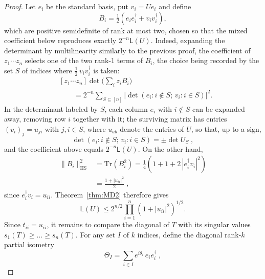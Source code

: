 \documentclass[aps,prl,twocolumn,superscriptaddress,reprint,longbibliography,nofootinbib]{revtex4-2}
\begin{document}
\begin{proof}
Let $e_i$ be the standard basis, put $v_i=Ue_i$ and define
\begin{equation}
    B_i=\tfrac12\left(e_ie_i^\dagger+v_iv_i^\dagger\right),
\end{equation}
 which are positive semidefinite of rank at most two, chosen so that the mixed coefficient below reproduces exactly $2^{-n}\mathsf{L}(U)$. Indeed, expanding the determinant by multilinearity similarly to the previous proof, the coefficient of $z_1\cdots z_n$ selects one of the two rank-1 terms of $B_i$, the choice being recorded by the set $S$ of indices where $\tfrac12\,v_iv_i^\dagger$ is taken:
\begin{equation}
\begin{split}
    &[z_1\cdots z_n]\det\!\Big(\sum_iz_iB_i\Big)\\ &\qquad =2^{-n}\!\!\sum_{S\subseteq[n]}\left|\det(e_i:i\notin S;\,v_i:i\in S)\right|^2 .
\end{split}
\end{equation}In the determinant labeled by $S$, each column $e_i$ with $i\notin S$ can be expanded away, removing row $i$ together with it; the surviving matrix has entries $(v_i)_j=u_{ji}$ with $j,i\in S$, where $u_{ab}$ denote the entries of $U$, so that, up to a sign,
\begin{equation}
    \det\left(e_i:i\notin S;\,v_i:i\in S\right)=\pm\det U_S\;,
\end{equation}
and the coefficient above equals $2^{-n}\mathsf{L}(U)$. On the other hand,
\begin{equation}
\begin{split}
    \|B_i\|^2_{\mathrm{HS}}&=\mathrm{Tr}(B_i^2)=\tfrac14\left(1+1+2\,|e_i^\dagger v_i|^2\right)\\
    &=\frac{1+|u_{ii}|^2}{2}\;,
\end{split}
\end{equation}
since $e_i^\dagger v_i=u_{ii}$. Theorem~\ref{thm:MD2} therefore gives
\begin{equation}
    \mathsf{L}(U)\le 2^{n/2}\prod_{i=1}^n\left(1+|u_{ii}|^2\right)^{1/2} .
    \label{eq:UL-first}
\end{equation}
Since $t_{ii}=u_{ii}$, it remains to compare the diagonal of $T$ with its singular values $s_1(T)\ge\dots\ge s_n(T)$. For any set $I$ of $k$ indices, define the diagonal rank-$k$ partial isometry
\begin{equation}
    \Theta_I=\sum_{i\in I}e^{i\theta_i}\,e_ie_i^\dagger\;,
\end{equation}

\end{proof}
\end{document}
